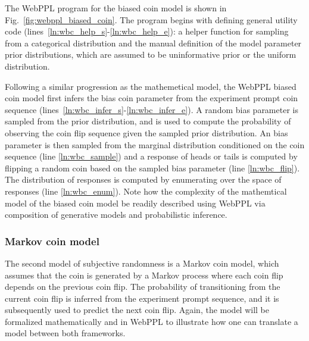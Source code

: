 \documentclass[11pt]{article}
\begin{document}
The WebPPL program for the biased coin model is shown in Fig.~\ref{fig:webppl_biased_coin}. The program begins with defining general utility code (lines~\ref{ln:wbc_help_s}-\ref{ln:wbc_help_e}): a helper function for sampling from a categorical distribution and the manual definition of the model parameter prior distributions, which are assumed to be uninformative prior or the uniform distribution. 

Following a similar progression as the mathemetical model, the WebPPL biased coin model first infers the bias coin parameter from the experiment prompt coin sequence (lines~\ref{ln:wbc_infer_s}-\ref{ln:wbc_infer_e}). A random bias parameter is sampled from the prior distribution, and is used to compute the probability of observing the coin flip sequence given the sampled prior distribution. An bias parameter is then sampled from the marginal distribution conditioned on the coin sequence (line \ref{ln:wbc_sample}) and a response of heads or tails is computed by flipping a random coin based on the sampled bias parameter (line \ref{ln:wbc_flip}). The distribution of responses is computed by enumerating over the space of responses (line \ref{ln:wbc_enum}). Note how the complexity of the mathemtical model of the biased coin model be readily described using WebPPL via composition of generative models and probabilistic inference. 

\subsubsection{Markov coin model}
\label{s:tutorial:sss:markov}
The second model of subjective randomness is a Markov coin model, which assumes that the coin is generated by a Markov process where each coin flip depends on the previous coin flip. The probability of transitioning from the current coin flip is inferred from the experiment prompt sequence, and it is subsequently used to predict the next coin flip. Again, the model will be formalized mathematically and in WebPPL to illustrate how one can translate a model between both frameworks.
\end{document}
